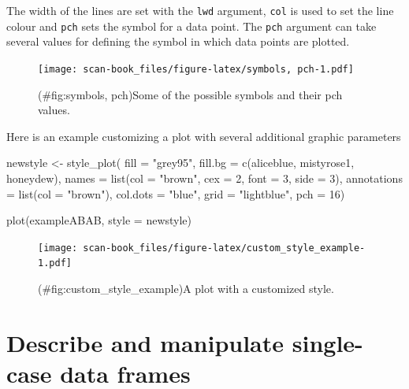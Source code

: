 \documentclass[
]{book}
\newenvironment{Shaded}{\begin{snugshade}}{\end{snugshade}}
\newcommand{\AttributeTok}[1]{\textcolor[rgb]{0.77,0.63,0.00}{#1}}
\newcommand{\DecValTok}[1]{\textcolor[rgb]{0.00,0.00,0.81}{#1}}
\newcommand{\FunctionTok}[1]{\textcolor[rgb]{0.00,0.00,0.00}{#1}}
\newcommand{\NormalTok}[1]{#1}
\newcommand{\OtherTok}[1]{\textcolor[rgb]{0.56,0.35,0.01}{#1}}
\newcommand{\StringTok}[1]{\textcolor[rgb]{0.31,0.60,0.02}{#1}}
\begin{document}
The width of the lines are set with the \texttt{lwd} argument, \texttt{col} is used to set the line colour and \texttt{pch} sets the symbol for a data point.
The \texttt{pch} argument can take several values for defining the symbol in which data points are plotted.

\begin{figure}
\centering
\texttt{[image: scan-book\_files/figure-latex/symbols, pch-1.pdf]}
\caption{(\#fig:symbols, pch)Some of the possible symbols and their pch values.}
\end{figure}

Here is an example customizing a plot with several additional graphic parameters

\begin{Shaded}
\begin{Highlighting}[]
\NormalTok{newstyle }\OtherTok{\textless{}{-}} \FunctionTok{style\_plot}\NormalTok{(}
  \AttributeTok{fill =} \StringTok{"grey95"}\NormalTok{,}
  \AttributeTok{fill.bg =} \FunctionTok{c}\NormalTok{(}\StringTok{\textquotesingle{}aliceblue\textquotesingle{}}\NormalTok{, }\StringTok{\textquotesingle{}mistyrose1\textquotesingle{}}\NormalTok{, }\StringTok{\textquotesingle{}honeydew\textquotesingle{}}\NormalTok{),}
  \AttributeTok{names =} \FunctionTok{list}\NormalTok{(}\AttributeTok{col =} \StringTok{"brown"}\NormalTok{, }\AttributeTok{cex =} \DecValTok{2}\NormalTok{, }\AttributeTok{font =} \DecValTok{3}\NormalTok{, }\AttributeTok{side =} \DecValTok{3}\NormalTok{),}
  \AttributeTok{annotations =} \FunctionTok{list}\NormalTok{(}\AttributeTok{col =} \StringTok{"brown"}\NormalTok{),}
  \AttributeTok{col.dots =} \StringTok{"blue"}\NormalTok{,}
  \AttributeTok{grid =} \StringTok{"lightblue"}\NormalTok{, }
  \AttributeTok{pch =} \DecValTok{16}\NormalTok{)}

\FunctionTok{plot}\NormalTok{(exampleABAB, }\AttributeTok{style =}\NormalTok{ newstyle)}
\end{Highlighting}
\end{Shaded}

\begin{figure}
\centering
\texttt{[image: scan-book\_files/figure-latex/custom\_style\_example-1.pdf]}
\caption{(\#fig:custom\_style\_example)A plot with a customized style.}
\end{figure}

\hypertarget{describe-and-manipulate-single-case-data-frames}{%
\chapter{Describe and manipulate single-case data frames}\label{describe-and-manipulate-single-case-data-frames}}
\end{document}
